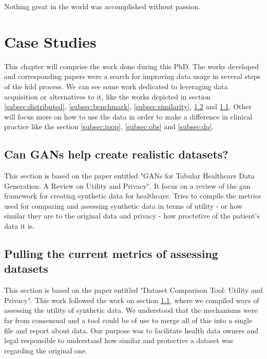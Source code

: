 \begin{savequote}[85mm]
Nothing great in the world was accomplished 
without passion.
\end{savequote}

\chapter{Case Studies}\label{chap:usecase}
This chapter will comprise the work done during this PhD. The works developed and corresponding papers were a search for improving data usage in several steps of the \ac{kdd} process. We can see some work dedicated to leveraging data acquisition or alternatives to it, like the works depicted in section \ref{subsec:distributed}, \ref{subsec:benchmark}, \ref{subsec:similarity}, \ref{subsec:tabular} and \ref{subsec:gans}. Other will focus more on how to use the data in order to make a difference in clinical practice like the section \ref{subsec:ipop}, \ref{subsec:obs} and \ref{subsec:dq}.



\section{Can GANs help create realistic datasets?}\label{subsec:gans}
This section is based on the paper entitled "GANs for Tabular Healthcare Data Generation: A Review on Utility and Privacy". It focus on a review of the \ac{gan} framework for creating synthetic data for healthcare. Tries to compile the metrics used for comparing and assessing synthetic data in terms of utility - or how similar they are to the original data and privacy - how proctetive of the patient's data it is. 



\section{Pulling the current metrics of assessing datasets}\label{subsec:tabular}
This section is based on the paper entitled "Dataset Comparison Tool: Utility and Privacy". This work followed the work on section \ref{subsec:gans}, where we compiled ways of assessing the utility of synthetic data. We understood that the mechanisms were far from consensual and a tool could be of use to merge all of this into a single file and report about data. Our purpose was to facilitate health data owners and legal responsible to understand how similar and protective a dataset was regarding the original one.

